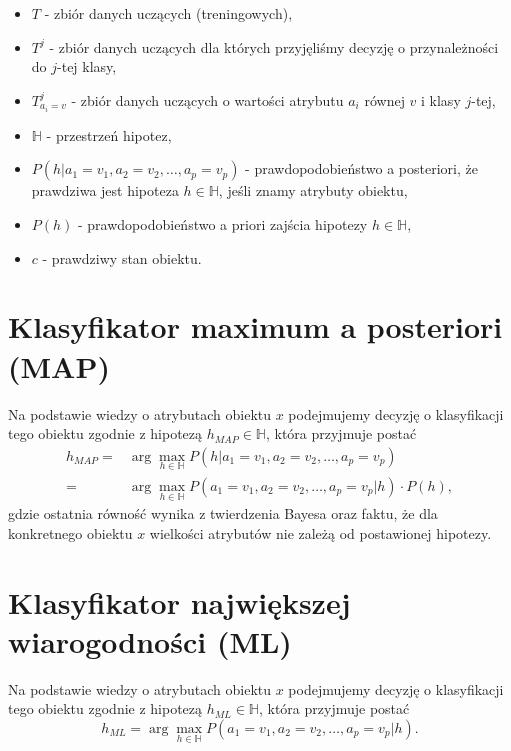 \documentclass[
]{book}
\providecommand{\tightlist}{%
  \setlength{\itemsep}{0pt}\setlength{\parskip}{0pt}}
\theoremstyle{plain}
\theoremstyle{definition}
\theoremstyle{definition}
\theoremstyle{definition}
\theoremstyle{definition}
\theoremstyle{definition}
\theoremstyle{remark}
\begin{document}
\begin{itemize}
\tightlist
\item
  \(T\) - zbiór danych uczących (treningowych),
\item
  \(T^j\) - zbiór danych uczących dla których przyjęliśmy decyzję o przynależności do \(j\)-tej klasy,
\item
  \(T^j_{a_i=v}\) - zbiór danych uczących o wartości atrybutu \(a_i\) równej \(v\) i klasy \(j\)-tej,
\item
  \(\mathbb{H}\) - przestrzeń hipotez,
\item
  \(P(h|a_1=v_1, a_2=v_2,\ldots,a_p=v_p)\) - prawdopodobieństwo a posteriori, że prawdziwa jest hipoteza \(h\in \mathbb{H}\), jeśli znamy atrybuty obiektu,
\item
  \(P(h)\) - prawdopodobieństwo a priori zajścia hipotezy \(h\in \mathbb{H}\),
\item
  \(c\) - prawdziwy stan obiektu.
\end{itemize}

\section{Klasyfikator maximum a posteriori (MAP)}\label{klasyfikator-maximum-a-posteriori-map}

Na podstawie wiedzy o atrybutach obiektu \(x\) podejmujemy decyzję o klasyfikacji tego obiektu zgodnie z hipotezą \(h_{MAP}\in \mathbb{H}\), która przyjmuje postać
\begin{align}\label{MAP}
        h_{MAP}=&\operatorname{arg}\max_{h\in \mathbb{H}}P(h|a_1=v_1, a_2=v_2,\ldots,a_p=v_p)\\
            =& \operatorname{arg}\max_{h\in \mathbb{H}}P(a_1=v_1, a_2=v_2,\ldots,a_p=v_p|h)\cdot P(h),
\end{align}
gdzie ostatnia równość wynika z twierdzenia Bayesa oraz faktu, że dla konkretnego obiektu \(x\) wielkości atrybutów nie zależą od postawionej hipotezy.

\section{Klasyfikator największej wiarogodności (ML)}\label{klasyfikator-najwiux119kszej-wiarogodnoux15bci-ml}

Na podstawie wiedzy o atrybutach obiektu \(x\) podejmujemy decyzję o klasyfikacji tego obiektu zgodnie z hipotezą \(h_{ML}\in \mathbb{H}\), która przyjmuje postać
\begin{equation}\label{ML}
        h_{ML}=\operatorname{arg}\max_{h\in \mathbb{H}}P(a_1=v_1, a_2=v_2,\ldots,a_p=v_p|h).
\end{equation}
\end{document}

